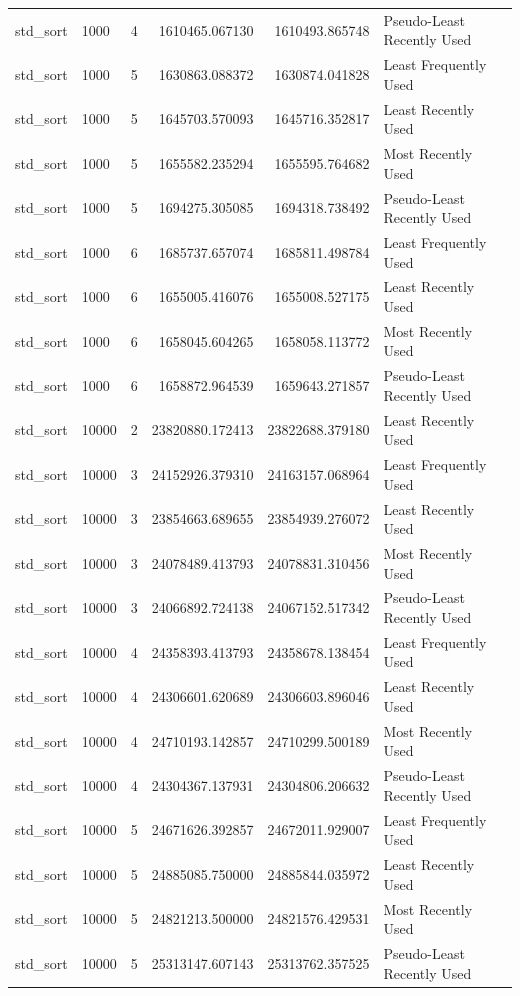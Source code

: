 \begin{tabular}{llrrrl}
std_sort & 1000 & 4 & 1610465.067130 & 1610493.865748 & Pseudo-Least Recently Used \\
std_sort & 1000 & 5 & 1630863.088372 & 1630874.041828 & Least Frequently Used \\
std_sort & 1000 & 5 & 1645703.570093 & 1645716.352817 & Least Recently Used \\
std_sort & 1000 & 5 & 1655582.235294 & 1655595.764682 & Most Recently Used \\
std_sort & 1000 & 5 & 1694275.305085 & 1694318.738492 & Pseudo-Least Recently Used \\
std_sort & 1000 & 6 & 1685737.657074 & 1685811.498784 & Least Frequently Used \\
std_sort & 1000 & 6 & 1655005.416076 & 1655008.527175 & Least Recently Used \\
std_sort & 1000 & 6 & 1658045.604265 & 1658058.113772 & Most Recently Used \\
std_sort & 1000 & 6 & 1658872.964539 & 1659643.271857 & Pseudo-Least Recently Used \\
std_sort & 10000 & 2 & 23820880.172413 & 23822688.379180 & Least Recently Used \\
std_sort & 10000 & 3 & 24152926.379310 & 24163157.068964 & Least Frequently Used \\
std_sort & 10000 & 3 & 23854663.689655 & 23854939.276072 & Least Recently Used \\
std_sort & 10000 & 3 & 24078489.413793 & 24078831.310456 & Most Recently Used \\
std_sort & 10000 & 3 & 24066892.724138 & 24067152.517342 & Pseudo-Least Recently Used \\
std_sort & 10000 & 4 & 24358393.413793 & 24358678.138454 & Least Frequently Used \\
std_sort & 10000 & 4 & 24306601.620689 & 24306603.896046 & Least Recently Used \\
std_sort & 10000 & 4 & 24710193.142857 & 24710299.500189 & Most Recently Used \\
std_sort & 10000 & 4 & 24304367.137931 & 24304806.206632 & Pseudo-Least Recently Used \\
std_sort & 10000 & 5 & 24671626.392857 & 24672011.929007 & Least Frequently Used \\
std_sort & 10000 & 5 & 24885085.750000 & 24885844.035972 & Least Recently Used \\
std_sort & 10000 & 5 & 24821213.500000 & 24821576.429531 & Most Recently Used \\
std_sort & 10000 & 5 & 25313147.607143 & 25313762.357525 & Pseudo-Least Recently Used \\

\end{tabular}
